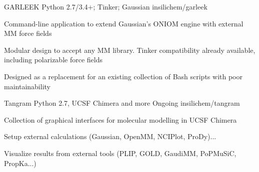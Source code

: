 \begin{cventries}
  \projectentry
    {GARLEEK} %
    {Python 2.7/3.4+; Tinker; Gaussian} %
    {} %
    {insilichem/garleek} %
    {
      \begin{cvitems} %
        \item {Command-line application to extend Gaussian's ONIOM engine with external MM force fields}
        \item {Modular design to accept any MM library. Tinker compatibility already available, including polarizable force fields}
        \item {Designed as a replacement for an existing collection of Bash scripts with poor maintainability}
      \end{cvitems}
    }

  \projectentry
    {Tangram} %
    {Python 2.7, UCSF Chimera and more} %
    {Ongoing} %
    {insilichem/tangram} %
    {
      \begin{cvitems} %
        \item {Collection of graphical interfaces for molecular modelling in UCSF Chimera}
        \item {Setup external calculations (Gaussian, OpenMM, NCIPlot, ProDy)...}
        \item {Visualize results from external tools (PLIP, GOLD, GaudiMM, PoPMuSiC, PropKa...)}
      \end{cvitems}
    }
\end{cventries}
